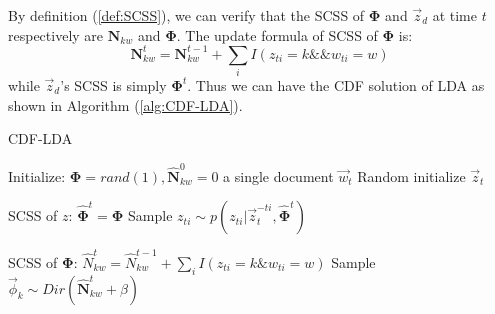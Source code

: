 \documentclass{article} %
\begin{document}
By definition (\ref{def:SCSS}), we can verify that the SCSS of $\bm{\Phi}$ and $\vec{z}_d$ at time $t$ respectively are $\bm{N}_{kw}$ and $\bm{\Phi}$. The update formula of SCSS of $\bm{\Phi}$ is: 
$$\bm{N}_{kw}^t=\bm{N}_{kw}^{t-1}+\sum_i I(z_{ti}=k \&\& w_{ti}=w)$$
while $\vec{z}_{d}$'s SCSS is simply $\bm{\Phi}^t$. Thus we can have the CDF solution of LDA as shown in Algorithm (\ref{alg:CDF-LDA}).


\begin{algorithm}[tb]
   \caption{CDF-LDA}
   \label{alg:CDF-LDA}
\begin{algorithmic}
   \STATE Initialize: $\bm{\Phi}=rand(1), \hat{\bm{N}}_{kw}^0=0$
   		    a single document $\vec{w}_{t }$
   		   \STATE Random initialize $\vec{z}_{t }$
   		   
   		   \STATE SCSS of $z$: $\hat{\bm{\Phi}}^t=\bm{\Phi}$		   
	   		   \STATE Sample $z_{t i} \sim p(z_{ti}|\vec{z}_t^{-ti}, \hat{\bm{\Phi}}^t)$
   		   \ENDFOR
   		   
           \STATE SCSS of $\bm{\Phi}$: $\hat{N}_{kw}^t=\hat{N}_{kw}^{t-1}+\sum_i I(z_{ti}=k \& w_{ti}=w)$
   		   		\STATE Sample ${\vec{\phi}}_k \sim Dir(\hat{\bm{N}}_{kw}^t+\beta)$
   		   \ENDFOR
   \ENDFOR
\end{algorithmic}
\end{algorithm}
\end{document}
